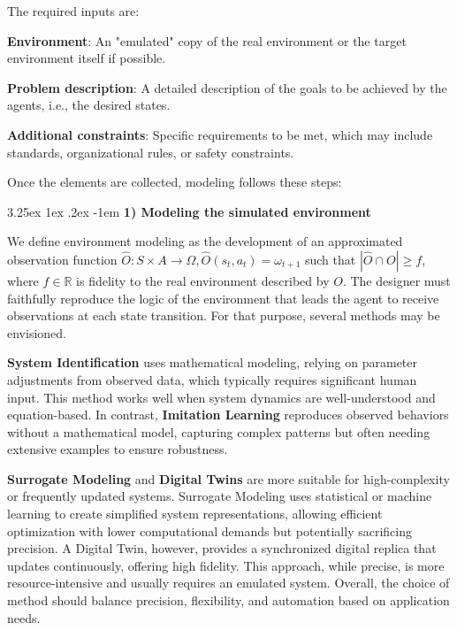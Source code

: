 \documentclass[conference]{IEEEtran}
\makeatletter
\renewcommand\paragraph{\@startsection{paragraph}{5}{\z@}%
  {3.25ex \@plus1ex \@minus.2ex}%
  {-1em}%
  {\normalfont\normalsize\bfseries}}
\makeatother
\begin{document}
The required inputs are:
\begin{enumerate*}[label={\roman*)}]
    \item \textbf{Environment}: An "emulated" copy of the real environment or the target environment itself if possible.
    \item \textbf{Problem description}: A detailed description of the goals to be achieved by the agents, i.e., the desired states.
    \item \textbf{Additional constraints}: Specific requirements to be met, which may include standards, organizational rules, or safety constraints.
\end{enumerate*}

Once the elements are collected, modeling follows these steps: 


\paragraph{\textbf{1) Modeling the simulated environment}} \quad

\noindent We define environment modeling as the development of an approximated observation function $\hat{O}: S \times A \to \Omega, \hat{O}(s_t,a_t) = \omega_{t+1}$ such that $|\hat{O} \cap O| \geq f$, where $f \in \mathbb{R}$ is fidelity to the real environment described by $O$.
The designer must faithfully reproduce the logic of the environment that leads the agent to receive observations at each state transition. 
For that purpose, several methods may be envisioned.

\textbf{System Identification} uses mathematical modeling, relying on parameter adjustments from observed data, which typically requires significant human input. This method works well when system dynamics are well-understood and equation-based. In contrast, \textbf{Imitation Learning} reproduces observed behaviors without a mathematical model, capturing complex patterns but often needing extensive examples to ensure robustness.

\textbf{Surrogate Modeling} and \textbf{Digital Twins} are more suitable for high-complexity or frequently updated systems. Surrogate Modeling uses statistical or machine learning to create simplified system representations, allowing efficient optimization with lower computational demands but potentially sacrificing precision. A Digital Twin, however, provides a synchronized digital replica that updates continuously, offering high fidelity. This approach, while precise, is more resource-intensive and usually requires an emulated system. Overall, the choice of method should balance precision, flexibility, and automation based on application needs.
\end{document}
